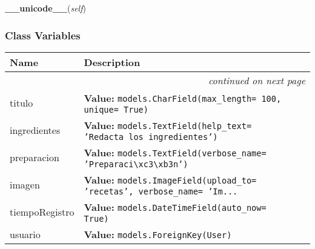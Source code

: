     \vspace{0.5ex}

\hspace{.8\funcindent}\begin{boxedminipage}{\funcwidth}

    \raggedright \textbf{\_\_unicode\_\_}(\textit{self})

\setlength{\parskip}{2ex}
\setlength{\parskip}{1ex}
    \end{boxedminipage}



  \subsubsection{Class Variables}

    \vspace{-1cm}
\hspace{\varindent}\begin{longtable}{|p{\varnamewidth}|p{\vardescrwidth}|l}
\cline{1-2}
\cline{1-2} \centering \textbf{Name} & \centering \textbf{Description}& \\
\cline{1-2}
\endhead\cline{1-2}\multicolumn{3}{r}{\small\textit{continued on next page}}\\\endfoot\cline{1-2}
\endlastfoot\raggedright t\-i\-t\-u\-l\-o\- & \raggedright \textbf{Value:} 
{\tt models.CharField(max\_length= 100, unique= True)}&\\
\cline{1-2}
\raggedright i\-n\-g\-r\-e\-d\-i\-e\-n\-t\-e\-s\- & \raggedright \textbf{Value:} 
{\tt models.TextField(help\_text= 'Redacta los ingredientes')}&\\
\cline{1-2}
\raggedright p\-r\-e\-p\-a\-r\-a\-c\-i\-o\-n\- & \raggedright \textbf{Value:} 
{\tt models.TextField(verbose\_name= 'Preparaci{\textbackslash}xc3{\textbackslash}xb3n')}&\\
\cline{1-2}
\raggedright i\-m\-a\-g\-e\-n\- & \raggedright \textbf{Value:} 
{\tt models.ImageField(upload\_to= 'recetas', verbose\_name= 'Im\texttt{...}}&\\
\cline{1-2}
\raggedright t\-i\-e\-m\-p\-o\-R\-e\-g\-i\-s\-t\-r\-o\- & \raggedright \textbf{Value:} 
{\tt models.DateTimeField(auto\_now= True)}&\\
\cline{1-2}
\raggedright u\-s\-u\-a\-r\-i\-o\- & \raggedright \textbf{Value:} 
{\tt models.ForeignKey(User)}&\\
\cline{1-2}
\end{longtable}

